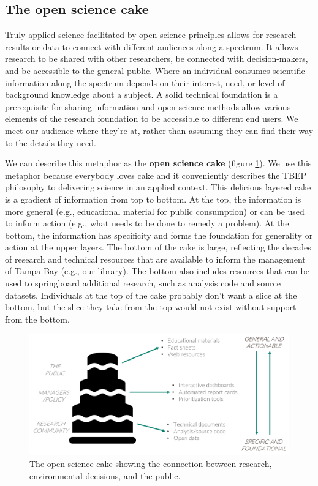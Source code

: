\documentclass[
]{book}
\begin{document}
\subsection{The open science cake}\label{the-open-science-cake}

Truly applied science facilitated by open science principles allows for research results or data to connect with different audiences along a spectrum. It allows research to be shared with other researchers, be connected with decision-makers, and be accessible to the general public. Where an individual consumes scientific information along the spectrum depends on their interest, need, or level of background knowledge about a subject. A solid technical foundation is a prerequisite for sharing information and open science methods allow various elements of the research foundation to be accessible to different end users. We meet our audience where they're at, rather than assuming they can find their way to the details they need.

We can describe this metaphor as the \textbf{open science cake} (figure \ref{fig:cake}). We use this metaphor because everybody loves cake and it conveniently describes the TBEP philosophy to delivering science in an applied context. This delicious layered cake is a gradient of information from top to bottom. At the top, the information is more general (e.g., educational material for public consumption) or can be used to inform action (e.g., what needs to be done to remedy a problem). At the bottom, the information has specificity and forms the foundation for generality or action at the upper layers. The bottom of the cake is large, reflecting the decades of research and technical resources that are available to inform the management of Tampa Bay (e.g., our \href{http://tbep.org/library}{library}). The bottom also includes resources that can be used to springboard additional research, such as analysis code and source datasets. Individuals at the top of the cake probably don't want a slice at the bottom, but the slice they take from the top would not exist without support from the bottom.

\begin{figure}

{\centering \includegraphics[width=1\linewidth]{img/cake} 

}

\caption{The open science cake showing the connection between research, environmental decisions, and the public.}\label{fig:cake}
\end{figure}
\end{document}
